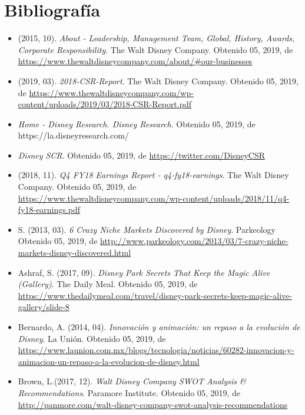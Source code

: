 \section{Bibliografía}

\begin{itemize}

\item
(2015, 10). \textit{About - Leadership, Management Team, Global, History, Awards, Corporate Responsibility}. The Walt Disney Company. Obtenido 05, 2019, de \url{https://www.thewaltdisneycompany.com/about/#our-businesses}

\item
(2019, 03). \textit{2018-CSR-Report}. The Walt Disney Company. Obtenido 05, 2019, de \url{https://www.thewaltdisneycompany.com/wp-content/uploads/2019/03/2018-CSR-Report.pdf}

\item
\textit{Home - Disney Research. Disney Research}. Obtenido 05, 2019, de https://la.disneyresearch.com/

\item
\textit{Disney SCR}. Obtenido 05, 2019, de \url{https://twitter.com/DisneyCSR}

\item
(2018, 11). \textit{Q4 FY18 Earnings Report - q4-fy18-earnings}. The Walt Disney Company. Obtenido 05, 2019, de \url{https://www.thewaltdisneycompany.com/wp-content/uploads/2018/11/q4-fy18-earnings.pdf}

\item
S. (2013, 03). \textit{6 Crazy Niche Markets Discovered by Disney}. Parkeology Obtenido 05, 2019, de \url{http://www.parkeology.com/2013/03/7-crazy-niche-markets-disney-discovered.html}

\item
Ashraf, S. (2017, 09). \textit{Disney Park Secrets That Keep the Magic Alive (Gallery)}. The Daily Meal. Obtenido 05, 2019, de \url{https://www.thedailymeal.com/travel/disney-park-secrets-keep-magic-alive-gallery/slide-8}

\item
Bernardo, A. (2014, 04).\textit{ Innovación y animación: un repaso a la evolución de Disney}. La Unión. Obtenido 05, 2019, de \url{https://www.launion.com.mx/blogs/tecnologia/noticias/60282-innovacion-y-animacion-un-repaso-a-la-evolucion-de-disney.html}

\item
Brown, L.(2017, 12). \textit{Walt Disney Company SWOT Analysis \& Recommendations}. Paramore Institute. Obtenido 05, 2019, de \url{http://panmore.com/walt-disney-company-swot-analysis-recommendations}


\end{itemize}
